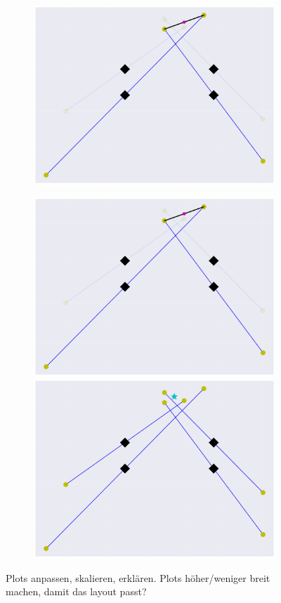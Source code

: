 \begin{figure}
\begin{subfigure}{0.45\textwidth}
        \includegraphics[width=0.8\linewidth]{Plots/stereo_magic_6.pdf} 
    \end{subfigure}
    \begin{subfigure}{0.45\textwidth}
        \includegraphics[width=0.8\linewidth]{Plots/stereo_magic_6.pdf}
        \includegraphics[width=0.8\linewidth]{Plots/stereo_magic_result.pdf}
    \end{subfigure}
    \caption{Plots anpassen, skalieren, erklären. Plots höher/weniger breit machen, damit das layout passt?}
    \label{fig:stereo_disp}
\end{figure}

